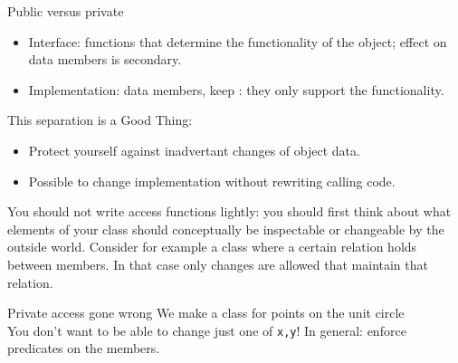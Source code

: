 \begin{block}{Public versus private}
  \label{sl:interfaceimpl}
  \begin{itemize}
  \item Interface:  functions that determine the
    functionality of the object; effect on data members is secondary.
  \item Implementation: data members, keep : they
    only support the functionality.
  \end{itemize}
  This separation is a Good Thing:
  \begin{itemize}
  \item Protect yourself against inadvertant changes of object data.
  \item Possible to change implementation without rewriting calling code.
  \end{itemize}
\end{block}

You should not write access functions lightly: you should first think
about what elements of your class should conceptually be inspectable
or changeable by the outside world.  Consider for example a class
where a certain relation holds between members. In that case only
changes are allowed that maintain that relation.

\begin{block}{Private access gone wrong}
  \label{sl:privatenogood}
  We make a class for points on the unit circle\\
  You don't want to be able to change just one of \lstinline{x,y}!
  In general: enforce predicates on the members.
\end{block}

\begin{comment}
  \Level 1 {Accessors}

  It is a good idea to keep data members private, and use accessor
  functions.

  \begin{exercise}
    \label{ex:geom:twoconstruct}
    Write a \lstinline{Point} class that has two constructors:
    \begin{lstlisting}
      class Point {
        private:
        // data members
        public:
        Point( float x,float y ) { /* ... */ };
        Point( float r,float theta ) { /* ... */ };
        float get_x() { /* ... */ };
        float get_y() { /* ... */ };
        float get_r() { /* ... */ };
        float get_theta() { /* ... */ };
      };
    \end{lstlisting}
    Use $r,\theta$ for the private variables, do not store $x,y$.
  \end{exercise}
\end{comment}


